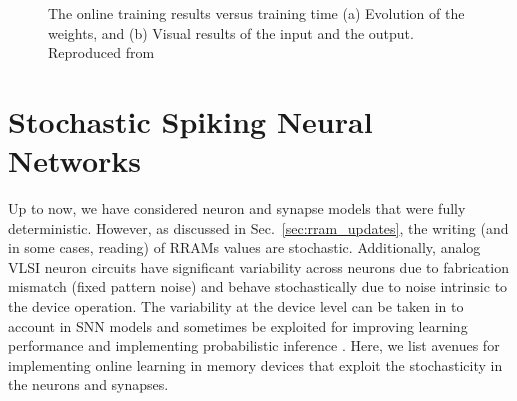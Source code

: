 \documentclass[english]{article}
\newcommand{\refsec}[1]{{Sec.~\ref{#1}}}
\renewcommand{\cite}{\citep}
\begin{document}
\begin{figure}[!t]
\centering
\vspace{-0.2in}
\hfil
\vspace{-0.01in}
\vspace{-0.05in}
\caption{The online training results versus training time (a) Evolution of the weights, and (b) Visual results of the input and the output. Reproduced from \cite{fouda2018independent}}
\label{FigResults}
\end{figure}

\section{Stochastic Spiking Neural Networks}
Up to now, we have considered neuron and synapse models that were fully deterministic. However, as discussed in \refsec{sec:rram_updates}, the writing (and in some cases, reading) of RRAMs values are stochastic. 
Additionally, analog VLSI neuron circuits have significant variability across neurons due to fabrication mismatch (fixed pattern noise) and behave stochastically due to noise intrinsic to the device operation.
The variability at the device level can be taken in to account in \ac{SNN} models and sometimes be exploited for improving learning performance and implementing probabilistic inference \cite{Querlioz_etal15_bioiprog,Naous_etal16_memrneura}. Here, we list avenues for implementing online learning in memory devices that exploit the stochasticity in the neurons and synapses.
\end{document}
